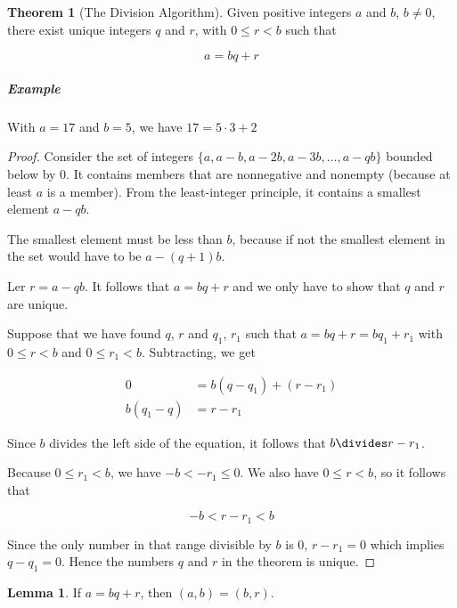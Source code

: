 \documentclass{article}
\theoremstyle{definition} %
\newtheorem{theorem}{Theorem}[section] %
\theoremstyle{definition}
\theoremstyle{definition}
\newtheorem{lemma}{Lemma}[section]
\theoremstyle{definition}
\begin{document}
  \begin{theorem}[The Division Algorithm]
    \label{th:division_algorithm} Given positive integers $a$ and $b$, $b \neq 0$, there exist unique integers
    $q$ and $r$, with $0 \leq r < b$ such that
    
    \begin{equation*}
      a = bq + r
    \end{equation*}
  \end{theorem}
  
  \subparagraph{Example} With $a = 17$ and $b = 5$, we have $17 = 5 \cdot 3 + 2$
  
  \begin{proof}
    Consider the set of integers $\{a, a - b, a - 2b, a - 3b, \dots, a - qb\}$ bounded below by 0.
    It contains members that are nonnegative and nonempty (because at least $a$ is a member).
    From the least-integer principle, it contains a smallest element $a - qb$.
    
    The smallest element must be less than $b$, because if not the smallest element in the set would have
    to be $a - (q + 1)b$.
    
    Ler $r = a - qb$. It follows that $a = bq + r$ and we only have to show that $q$ and $r$ are unique.
    
    Suppose that we have found $q$, $r$ and $q_1$, $r_1$ such that $a = bq + r = bq_1 + r_1$ with
    $0 \leq r < b$ and $0 \leq r_1 < b$. Subtracting, we get
    
    \begin{align*}
      0 &= b(q - q_1) + (r - r_1) \\
      b(q_1 - q) &= r - r_1
    \end{align*}
    
    Since $b$ divides the left side of the equation, it follows that $b \divides r - r_1$.
    
    Because $0 \leq r_1 < b$, we have $-b < -r_1 \leq 0$. We also have $0 \leq r < b$, so it follows that
    
    \begin{equation*}
      -b < r - r_1 < b
    \end{equation*}
    
    Since the only number in that range divisible by $b$ is 0, $r - r_1 = 0$ which implies $q - q_1 = 0$.
    Hence the numbers $q$ and $r$ in the theorem is unique.
  \end{proof}
  
  \begin{lemma}
    If $a = bq + r$, then $(a, b) = (b, r)$.
  \end{lemma}
  
\end{document}
